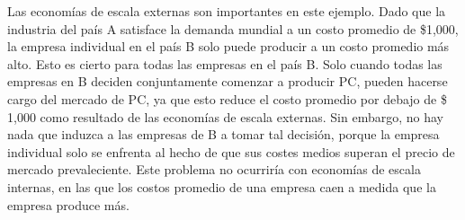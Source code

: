 Las economías de escala externas son importantes en este ejemplo. Dado que la industria del país A satisface la demanda mundial a un costo promedio de \$1,000, la empresa individual en el país B solo puede producir a un costo promedio más alto. Esto es cierto para todas las empresas en el país B. Solo cuando todas las empresas en B deciden conjuntamente comenzar a producir PC, pueden hacerse cargo del mercado de PC, ya que esto reduce el costo promedio por debajo de \$ 1,000 como resultado de las economías de escala externas. Sin embargo, no hay nada que induzca a las empresas de B a tomar tal decisión, porque la empresa individual solo se enfrenta al hecho de que sus costes medios superan el precio de mercado prevaleciente. Este problema no ocurriría con economías de escala internas, en las que los costos promedio de una empresa caen a medida que la empresa produce más.

